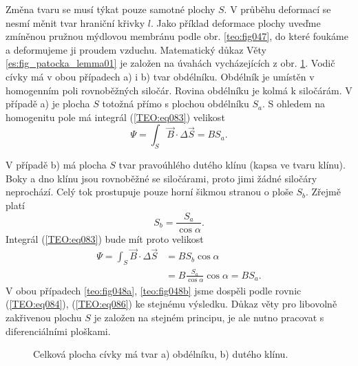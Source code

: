       Změna tvaru se musí týkat pouze samotné plochy \(S\). V průběhu deformací se nesmí měnit tvar
      hraniční křivky \(l\). Jako příklad deformace plochy uveďme zmíněnou pružnou mýdlovou membránu
      podle obr. \ref{teo:fig047}, do které foukáme a deformujeme ji proudem vzduchu. Matematický
      důkaz Věty \ref{es:fig_patocka_lemma01} je založen na úvahách vycházejících z obr.
      \ref{teo:fig048}. Vodič cívky má v obou případech a) i b) tvar obdélníku. Obdélník je umístěn
      v homogenním poli rovnoběžných siločár. Rovina obdélníku je kolmá k siločárám. V případě a) je
      plocha \(S\) totožná přímo s plochou obdélníku \(S_a\). S ohledem na homogenitu pole má
      integrál (\ref{TEO:eq083}) velikost
      \begin{equation}\label{TEO:eq084}
        \Psi = \int_S\vec{B}\cdot\Delta \vec{S} = BS_a.
      \end{equation}

      V případě b) má plocha \(S\) tvar pravoúhlého dutého klínu (kapsa ve tvaru klínu). Boky a dno 
      klínu jsou rovnoběžné se siločárami, proto jimi žádné siločáry neprochází. Celý tok 
      prostupuje pouze horní šikmou stranou o ploše \(S_b\). Zřejmě platí
      \begin{equation}\label{TEO:eq085}
        S_b = \frac{S_a}{\cos\alpha}.
      \end{equation}
      Integrál (\ref{TEO:eq083}) bude mít proto velikost
      \begin{align}
        \Psi  = \int_S\vec{B}\cdot\Delta \vec{S} 
             &= BS_b\cos\alpha                                       \nonumber \\ 
             &= B\frac{S_a}{\cos\alpha}\cos\alpha = BS_a.            \label{TEO:eq086}
      \end{align}
      V obou případech \ref{teo:fig048a}, \ref{teo:fig048b} jsme dospěli podle rovnic
      (\ref{TEO:eq084}), (\ref{TEO:eq086}) ke stejnému výsledku. Důkaz věty pro libovolně zakřivenou
      plochu \(S\) je založen na stejném principu, je ale nutno pracovat s diferenciálními ploškami.
      \begin{figure}[ht!]
        \centering  
        \caption{Celková plocha cívky má tvar a) obdélníku, b) dutého klínu. \cite[s.~16]{Patocka4}} 
        \label{teo:fig048}
      \end{figure}
      
